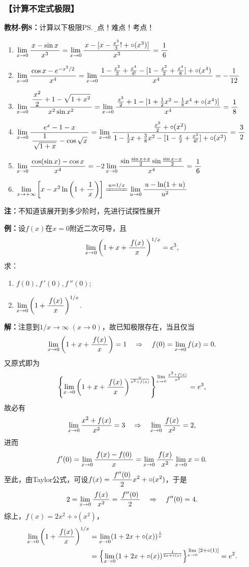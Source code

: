 \subsubsection{【计算不定式极限】}

{\bf 教材-例8：}计算以下极限\ps{\b 重点！难点！考点！}
\begin{enumerate}[(1)]
  \setlength{\itemindent}{1cm}
  \item $\limx{0}\df{x-\sin x}{x^3}
  =\limx0\df{x-[x-\frac{x^3}3!+\circ(x^3)]}{x^3}=\df16$
  \item $\limx{0}\df{\cos x-e^{-x^2/2}}{x^4}
  =\limx0\df{1-\frac{x^2}2+\frac{x^4}{4!}-[1-\frac{x^2}2+
  \frac{x^4}8]+\circ(x^4)}{x^4}=-\df1{12}$ 
  \item $\limx{0}\df{\df{x^2}{2}+1-\sqrt{1+x^2}}{x^2\sin x^2}
  =\limx0\df{\frac{x^2}2+1-[1+\frac12{x^2}-\frac18x^4+\circ(x^4)]}{x^4}
  =\df18$ 
  \item $\limx{0}\df{e^x-1-x}{\df{1}{\sqrt{1+x}}-\cos\sqrt x}
  =\limx0\df{\frac{x^2}2+\circ(x^2)}{1-\frac12x+\frac38x^2-[1-\frac{x}2+\frac{x^2}{4!}]+\circ(x^2)}
  =\df32$ 
  \item $\limx{0}\df{\cos(\sin x)-\cos x}{x^4}
  =-2\limx0\df{\sin\frac{\sin x+x}2\sin\frac{\sin x-x}2}{x^4}=\df16$
  \item $\limx{+\infty}\left[x-x^2\ln\left(1+\df 1x\right)\right]
  \xlongequal{u=1/x}\lim\limits_{u\to0}\df{u-\ln(1+u)}{u^2}$
\end{enumerate}

{\bf 注：}不知道该展开到多少阶时，先进行试探性展开

{\bf 例：}设$f(x)$在$x=0$附近二次可导，且
$$\limx{0}\left(1+x+\df{f(x)}{x}\right)^{1/x}=e^3,$$
求：
\begin{enumerate}[(1)]
  \setlength{\itemindent}{1cm}
  \item $f(0),f\,'(0),f\,''(0)$;
  \item $\limx{0}\left(1+\df{f(x)}{x}\right)^{1/x}$.
\end{enumerate}

{\bf 解：}注意到$1/x\to\infty\;(x\to0)$，故已知极限存在，当且仅当
$$\limx0\left(1+x+\df{f(x)}x\right)=1
\quad\Rightarrow\quad f(0)=\limx0f(x)=0.$$
又原式即为
$$\left\{\limx0\left(1+x+\df{f(x)}{x}\right)
^{\frac{x}{x^2+f(x)}}\right\}^{\limx0\frac{x^2+f(x)}{x^2}}=e^3,$$
故必有
$$\limx0\frac{x^2+f(x)}{x^2}=3\quad\Rightarrow\quad
\limx0\df{f(x)}{x^2}=2,$$
进而
$$f'(0)=\limx0\df{f(x)-f(0)}x=\limx0\df{f(x)}{x^2}\limx0x=0.$$
至此，由Taylor公式，可设$f(x)=\df{f''(0)}2x^2+\circ(x^2)$，于是
$$2=\limx0\df{f(x)}{x^2}=\df{f''(0)}2\quad\Rightarrow\quad
f''(0)=4.$$
综上，$f(x)=2x^2+\circ(x^2)$，
\begin{align}
	\limx{0}\left(1+\df{f(x)}{x}\right)^{1/x}
	&=\limx0(1+2x+\circ(x))^{\frac1x}\notag\\
	&=\left\{\limx0(1+2x+\circ(x))^{\frac1{2x+\circ(x)}}\right\}
	^{\limx0{[2+\circ(1)]}}=e^2.\notag	
\end{align}

